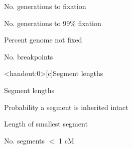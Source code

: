 \documentclass[aspectratio=169,12pt,t]{beamer}
\begin{document}
\begin{frame}[c]{No. generations to fixation}

\note{
}

\end{frame}

\begin{frame}[c]{No. generations to 99\% fixation}

\note{
}

\end{frame}

\begin{frame}[c]{Percent genome not fixed}

\note{
}

\end{frame}

\begin{frame}[c]{No. breakpoints}

\note{
}

\end{frame}

\begin{frame}<handout:0>[c]{Segment lengths}

\end{frame}

\begin{frame}[c]{Segment lengths}

\note{
}

\end{frame}

\begin{frame}[c]{Probability a segment is inherited intact}

\note{
}

\end{frame}

\begin{frame}[c]{Length of smallest segment}

\note{
}

\end{frame}

\begin{frame}[c]{No. segments $<$ 1 cM}

\note{
}

\end{frame}
\end{document}
